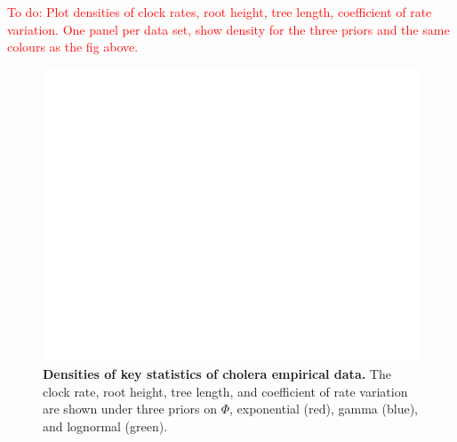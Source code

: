 \documentclass[10pt,letterpaper]{article}
\begin{document}
\textcolor{red}{To do: Plot densities of clock rates, root height, tree length, coefficient of rate variation. One panel per data set, show density for the three priors and the same colours as the fig above.}

\begin{figure}[!h]
	\begin{center}
		\includegraphics[width=13cm]{sandbox_figures/cholera_density_plot.pdf}\newline
		\vspace{-0.5cm}
		\caption{\textbf{Densities of key statistics of cholera empirical data.} The clock rate, root height, tree length, and coefficient of rate variation are shown under three priors on $\Phi$, exponential (red), gamma (blue), and lognormal (green).}
	\end{center}
\end{figure}
\end{document}
